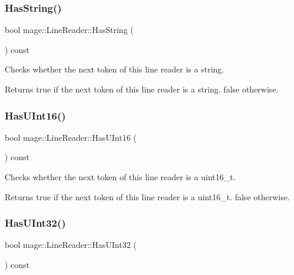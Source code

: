 \subsubsection{\texorpdfstring{Has\+String()}{HasString()}}
{\footnotesize\ttfamily bool mage\+::\+Line\+Reader\+::\+Has\+String (\begin{DoxyParamCaption}{ }\end{DoxyParamCaption}) const\hspace{0.3cm}{\ttfamily [protected]}}

Checks whether the next token of this line reader is a string.

\begin{DoxyReturn}{Returns}
{\ttfamily true} if the next token of this line reader is a string. {\ttfamily false} otherwise. 
\end{DoxyReturn}
\hypertarget{classmage_1_1_line_reader_a15c7c3336330649062556e5b318af510}{}\label{classmage_1_1_line_reader_a15c7c3336330649062556e5b318af510} 
\subsubsection{\texorpdfstring{Has\+U\+Int16()}{HasUInt16()}}
{\footnotesize\ttfamily bool mage\+::\+Line\+Reader\+::\+Has\+U\+Int16 (\begin{DoxyParamCaption}{ }\end{DoxyParamCaption}) const\hspace{0.3cm}{\ttfamily [protected]}}

Checks whether the next token of this line reader is a {\ttfamily uint16\+\_\+t}.

\begin{DoxyReturn}{Returns}
{\ttfamily true} if the next token of this line reader is a {\ttfamily uint16\+\_\+t}. {\ttfamily false} otherwise. 
\end{DoxyReturn}
\hypertarget{classmage_1_1_line_reader_a56f82d5562d0254ec59871a3bb7ad837}{}\label{classmage_1_1_line_reader_a56f82d5562d0254ec59871a3bb7ad837} 
\subsubsection{\texorpdfstring{Has\+U\+Int32()}{HasUInt32()}}
{\footnotesize\ttfamily bool mage\+::\+Line\+Reader\+::\+Has\+U\+Int32 (\begin{DoxyParamCaption}{ }\end{DoxyParamCaption}) const\hspace{0.3cm}{\ttfamily [protected]}}

